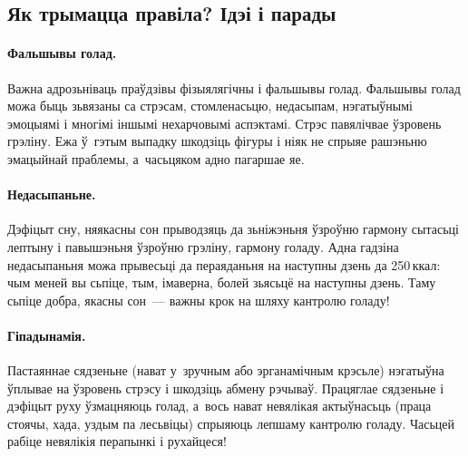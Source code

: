 
\subsection{Як трымацца правіла? Ідэі і парады}

\paragraph{Фальшывы голад.}
Важна адрозьніваць праўдзівы фізыялягічны і фальшывы голад. Фальшывы голад можа быць зьвязаны са стрэсам, стомленасьцю, недасыпам, нэгатыўнымі эмоцыямі і многімі іншымі нехарчовымі аспэктамі. Стрэс павялічвае ўзровень грэліну. Ежа ў~гэтым выпадку шкодзіць фігуры і ніяк не спрыяе рашэньню эмацыйнай праблемы, а~часьцяком адно пагаршае яе.

\paragraph{Недасыпаньне.}
Дэфіцыт сну, няякасны сон прыводзяць да зьніжэньня ўзроўню гармону сытасьці лептыну і павышэньня ўзроўню грэліну, гармону голаду. Адна гадзіна недасыпаньня можа прывесьці да пераяданьня на наступны дзень да 250\,ккал: чым меней вы сьпіце, тым, імаверна, болей зьясьцё на наступны дзень. Таму сьпіце добра, якасны сон~--- важны крок на шляху кантролю голаду!

\paragraph{Гіпадынамія.}
Пастаяннае сядзеньне (нават у~зручным або эрганамічным крэсьле) нэгатыўна ўплывае на ўзровень стрэсу і шкодзіць абмену рэчываў. Працяглае сядзеньне і дэфіцыт руху ўзмацняюць голад, а~вось нават невялікая актыўнасьць (праца стоячы, хада, уздым па лесьвіцы) спрыяюць лепшаму кантролю голаду. Часьцей рабіце невялікія перапынкі і рухайцеся!


